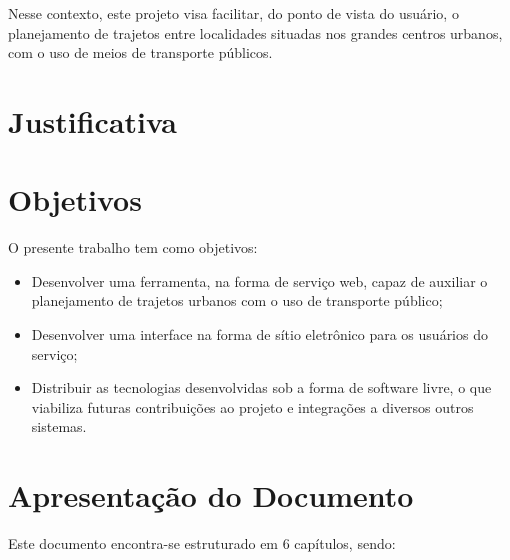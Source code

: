 Nesse contexto, este projeto visa facilitar, do ponto de vista do usuário, o planejamento de trajetos entre localidades situadas nos grandes centros urbanos, com o uso de meios de transporte públicos.

\section{Justificativa}


\section{Objetivos}

O presente trabalho tem como objetivos:

\begin{itemize}
	\item Desenvolver uma ferramenta, na forma de serviço web, capaz de auxiliar o planejamento de trajetos urbanos com o uso de transporte público;
	\item Desenvolver uma interface na forma de sítio eletrônico para os usuários do serviço;
	\item Distribuir as tecnologias desenvolvidas sob a forma de software livre, o que viabiliza futuras contribuições ao projeto e integrações a diversos outros sistemas.
\end{itemize}

\section{Apresentação do Documento}
Este documento encontra-se estruturado em 6 capítulos, sendo:

